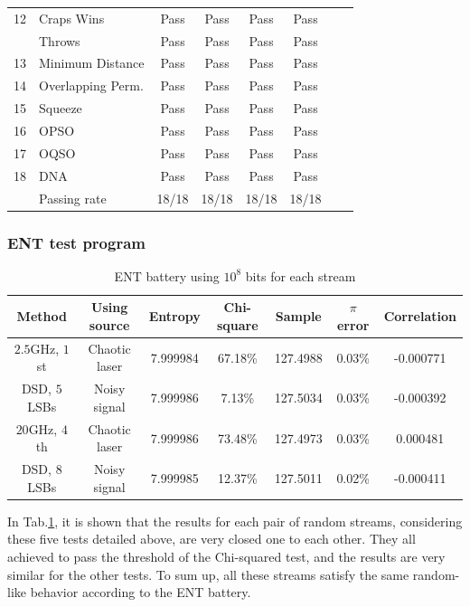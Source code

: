 \begin{table}[!t]
\begin{tabular}{llcccccc}
      12 &Craps Wins &Pass &Pass&Pass &Pass \\
      &Throws &Pass &Pass&Pass &Pass \\
      13 &Minimum Distance &Pass &Pass&Pass &Pass\\
      14 &Overlapping Perm. &Pass &Pass&Pass &Pass \\
      15 &Squeeze &Pass &Pass&Pass &Pass \\
      16 &OPSO &Pass &Pass &Pass &Pass \\
      17 &OQSO &Pass &Pass &Pass &Pass \\
      18 &DNA &Pass &Pass&Pass &Pass \\
      &Passing rate &18/18 &18/18&18/18 &18/18\\\bottomrule
    \end{tabular}
  \end{table}

\subsubsection{ENT test program}

\begin{table}
  \renewcommand{\arraystretch}{1.3}
  \caption{ENT battery using $10^8$ bits for each stream}
  \label{ent}
  \centering
  \begin{tabular}{|c|c|c|c|c|c|c|}
    \hline
    Method &Using source& Entropy & Chi-square & Sample & $\pi$ error & Correlation \\ \hline\hline
    $2.5$GHz, $1$st  & Chaotic laser & 7.999984 & 67.18\% & 127.4988 & 0.03\% & -0.000771 \\  
    DSD, $5$ LSBs& Noisy signal & 7.999986 & 7.13\% & 127.5034 & 0.03\% & -0.000392 \\ \hline
    $20$GHz, $4$th  & Chaotic laser & 7.999986 & 73.48\% & 127.4973 & 0.03\% & 0.000481 \\ 
    DSD, $8$ LSBs& Noisy signal & 7.999985 & 12.37\% & 127.5011 & 0.02\% & -0.000411 \\ \hline
  \end{tabular}
\end{table}
%
In Tab.\ref{ent}, it is shown that the results for each pair of
random streams, considering these five tests detailed above, are very
closed one to each other. They all achieved to pass the threshold of
the Chi-squared test, and the results are very similar for the other
tests. To sum up, all these streams satisfy the same random-like
behavior according to the ENT battery.

